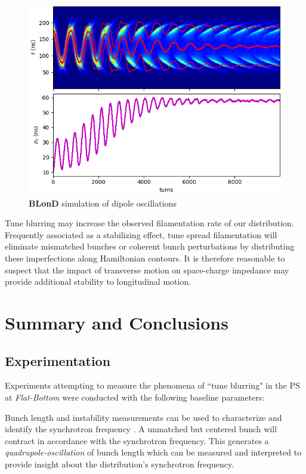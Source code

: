 \begin{figure}
    \centering
    \includegraphics{figs/dipole_oscillation.png}
    \caption{\textbf{BLonD} simulation of dipole oscillations}
    \label{fig:filamentation}
\end{figure}

Tune blurring may increase the observed filamentation rate of our distribution.  Frequently associated as a stabilizing effect, tune spread filamentation will eliminate mismatched bunches or coherent bunch perturbations by distributing these imperfections along Hamiltonian contours. It is therefore reasonable to suspect that the impact of transverse motion on space-charge impedance may provide additional stability to longitudinal motion.

\chapter{Summary and Conclusions}

\section{Experimentation}

Experiments attempting to measure the phenomena of ``tune blurring"  in the PS at \textit{Flat-Bottom} were conducted with the following baseline parameters:



Bunch length and instability measurements can be used to characterize and identify the synchrotron frequency \cite{sacherer_bunch_1977}. A unmatched but centered bunch will contract in accordance with the synchrotron frequency. This generates a \textit{quadrupole-oscillation} of bunch length which can be measured and interpreted to provide insight about the distribution's synchrotron frequency.

